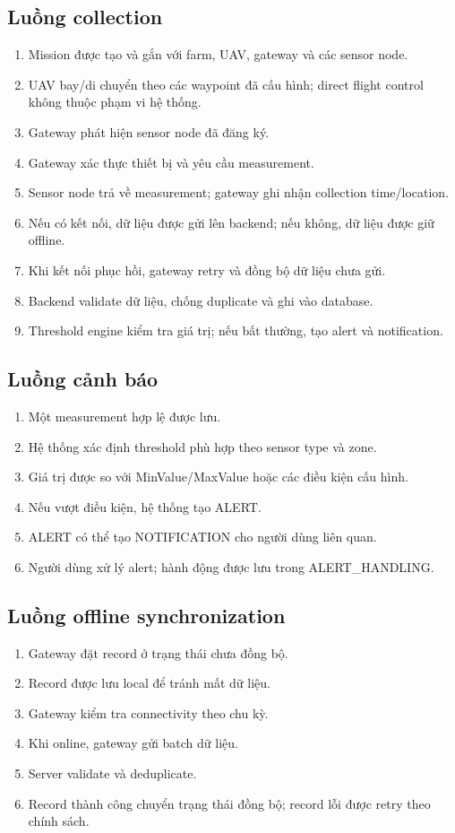 \subsection{Luồng collection}
\begin{enumerate}
  \item Mission được tạo và gắn với farm, UAV, gateway và các sensor node.
  \item UAV bay/di chuyển theo các waypoint đã cấu hình; direct flight control không thuộc phạm vi hệ thống.
  \item Gateway phát hiện sensor node đã đăng ký.
  \item Gateway xác thực thiết bị và yêu cầu measurement.
  \item Sensor node trả về measurement; gateway ghi nhận collection time/location.
  \item Nếu có kết nối, dữ liệu được gửi lên backend; nếu không, dữ liệu được giữ offline.
  \item Khi kết nối phục hồi, gateway retry và đồng bộ dữ liệu chưa gửi.
  \item Backend validate dữ liệu, chống duplicate và ghi vào database.
  \item Threshold engine kiểm tra giá trị; nếu bất thường, tạo alert và notification.
\end{enumerate}

\subsection{Luồng cảnh báo}
\begin{enumerate}
  \item Một measurement hợp lệ được lưu.
  \item Hệ thống xác định threshold phù hợp theo sensor type và zone.
  \item Giá trị được so với MinValue/MaxValue hoặc các điều kiện cấu hình.
  \item Nếu vượt điều kiện, hệ thống tạo ALERT.
  \item ALERT có thể tạo NOTIFICATION cho người dùng liên quan.
  \item Người dùng xử lý alert; hành động được lưu trong ALERT\_HANDLING.
\end{enumerate}

\subsection{Luồng offline synchronization}
\begin{enumerate}
  \item Gateway đặt record ở trạng thái chưa đồng bộ.
  \item Record được lưu local để tránh mất dữ liệu.
  \item Gateway kiểm tra connectivity theo chu kỳ.
  \item Khi online, gateway gửi batch dữ liệu.
  \item Server validate và deduplicate.
  \item Record thành công chuyển trạng thái đồng bộ; record lỗi được retry theo chính sách.
\end{enumerate}

